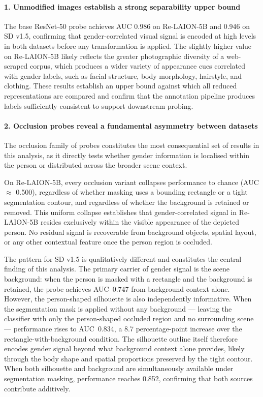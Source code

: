 \paragraph{1. Unmodified images establish a strong separability upper bound}

The base ResNet-50 probe achieves AUC 0.986 on Re-LAION-5B and 0.946 on SD v1.5,
confirming that gender-correlated visual signal is encoded at high levels in both datasets
before any transformation is applied. The slightly higher value on Re-LAION-5B likely
reflects the greater photographic diversity of a web-scraped corpus, which produces a
wider variety of appearance cues correlated with gender labels, such as facial structure,
body morphology, hairstyle, and clothing. These results establish an upper bound against
which all reduced representations are compared and confirm that the annotation pipeline
produces labels sufficiently consistent to support downstream probing.

\paragraph{2. Occlusion probes reveal a fundamental asymmetry between datasets}

The occlusion family of probes constitutes the most consequential set of results in this
analysis, as it directly tests whether gender information is localised within the person
or distributed across the broader scene context.

On Re-LAION-5B, every occlusion variant collapses performance to chance (AUC
$\approx$ 0.500), regardless of whether masking uses a bounding rectangle or a tight
segmentation contour, and regardless of whether the background is retained or removed.
This uniform collapse establishes that gender-correlated signal in Re-LAION-5B resides
exclusively within the visible appearance of the depicted person. No residual signal is
recoverable from background objects, spatial layout, or any other contextual feature once
the person region is occluded.

The pattern for SD v1.5 is qualitatively different and constitutes the central finding of
this analysis. The primary carrier of gender signal is the scene background: when the
person is masked with a rectangle and the background is retained, the probe achieves
AUC~0.747 from background context alone. However, the person-shaped silhouette is also
independently informative. When the segmentation mask is applied without any background
--- leaving the classifier with only the person-shaped occluded region and no surrounding
scene --- performance rises to AUC~0.834, a 8.7 percentage-point increase over the
rectangle-with-background condition. The silhouette outline itself therefore encodes
gender signal beyond what background context alone provides, likely through the body
shape and spatial proportions preserved by the tight contour. When both silhouette and
background are simultaneously available under segmentation masking, performance reaches
0.852, confirming that both sources contribute additively.

